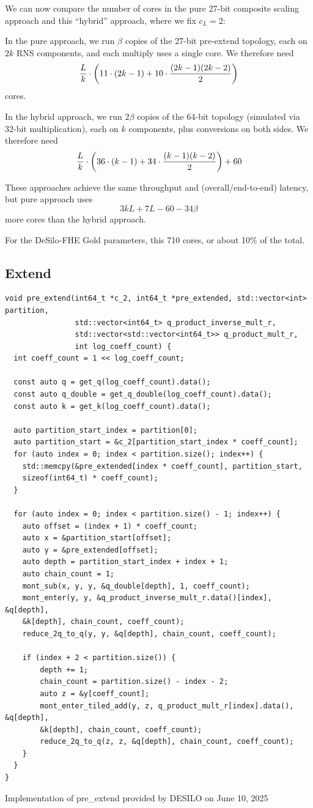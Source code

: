 \documentclass[../../fheimpl.tex]{subfiles}
\begin{document}
We can now compare the number of cores in the pure 27-bit composite scaling approach and this ``hybrid'' approach, where we fix $c_L=2$:

In the pure approach, we run $\beta$ copies of the 27-bit pre-extend topology, each on $2k$ RNS components, and each multiply uses a single core. We therefore need
\[\frac{L}{k}\cdot\parens*{11\cdot(2k-1)+10\cdot\frac{(2k-1)(2k-2)}{2}}\]
cores.

In the hybrid approach, we run $2\beta$ copies of the 64-bit topology (simulated via 32-bit multiplication), each on $k$ components, plus conversions on both sides. We therefore need
\[\frac{L}{k}\cdot\parens*{36\cdot(k-1)+34\cdot\frac{(k-1)(k-2)}{2}} + 60\]

These approaches achieve the same throughput and (overall/end-to-end) latency, but pure approach uses 
\[3kL+7L-60-34\beta\]
more cores than the hybrid approach.

For the DeSilo-FHE Gold parameters, this 710 cores, or about 10\% of the total.

\subsection{Extend}
\begin{listing}
	\begin{verbatim}
void pre_extend(int64_t *c_2, int64_t *pre_extended, std::vector<int> partition,
                std::vector<int64_t> q_product_inverse_mult_r,
                std::vector<std::vector<int64_t>> q_product_mult_r,
                int log_coeff_count) {
  int coeff_count = 1 << log_coeff_count;

  const auto q = get_q(log_coeff_count).data();
  const auto q_double = get_q_double(log_coeff_count).data();
  const auto k = get_k(log_coeff_count).data();

  auto partition_start_index = partition[0];
  auto partition_start = &c_2[partition_start_index * coeff_count];
  for (auto index = 0; index < partition.size(); index++) {
	std::memcpy(&pre_extended[index * coeff_count], partition_start,
	sizeof(int64_t) * coeff_count);
  }

  for (auto index = 0; index < partition.size() - 1; index++) {
	auto offset = (index + 1) * coeff_count;
	auto x = &partition_start[offset];
	auto y = &pre_extended[offset];
	auto depth = partition_start_index + index + 1;
	auto chain_count = 1;
	mont_sub(x, y, y, &q_double[depth], 1, coeff_count);
	mont_enter(y, y, &q_product_inverse_mult_r.data()[index], &q[depth],
	&k[depth], chain_count, coeff_count);
	reduce_2q_to_q(y, y, &q[depth], chain_count, coeff_count);
	
	if (index + 2 < partition.size()) {
		depth += 1;
		chain_count = partition.size() - index - 2;
		auto z = &y[coeff_count];
		mont_enter_tiled_add(y, z, q_product_mult_r[index].data(), &q[depth],
		&k[depth], chain_count, coeff_count);
		reduce_2q_to_q(z, z, &q[depth], chain_count, coeff_count);
	}
  }
}
	\end{verbatim}
	\caption{Implementation of \textsf{pre\_extend} provided by DESILO on June 10, 2025}
	\label{alg:preextend}
\end{listing}
\end{document}

